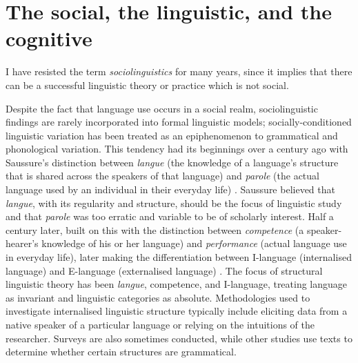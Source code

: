 						
\section{The social, the linguistic, and the cognitive}

\epigraph{I have resisted the term \textit{sociolinguistics} for many years, since it implies that there can be a successful linguistic theory or practice which is not social.}{\citet[xix]{labov1972sociolingpatterns}}

\noindent Despite the fact that language use occurs in a social realm, sociolinguistic findings are rarely incorporated into formal linguistic models; socially-conditioned linguistic variation has been treated as an epiphenomenon to grammatical and phonological variation. This tendency had its beginnings over a century ago with Saussure's distinction between \textit{langue} (the knowledge of a language's structure that is shared across the speakers of that language) and \textit{parole} (the actual language used by an individual in their everyday life) \citep{saussure1916}. Saussure believed that \textit{langue}, with its regularity and structure, should be the focus of linguistic study and that \textit{parole} was too erratic and variable to be of scholarly interest. Half a century later, \citet[4]{chomsky1965} built on this with the distinction between \textit{competence} (a speaker-hearer's knowledge of his or her language) and \textit{performance} (actual language use in everyday life), later making the differentiation between I-language (internalised language) and E-language (externalised language) \citep[20-22]{chomsky1986}. The focus of structural linguistic theory has been \textit{langue}, competence, and I-language, treating language as invariant and linguistic categories as absolute. Methodologies used to investigate internalised linguistic structure typically include eliciting data from a native speaker of a particular language or relying on the intuitions of the researcher. Surveys are also sometimes conducted, while other studies use texts to determine whether certain structures are grammatical. 

